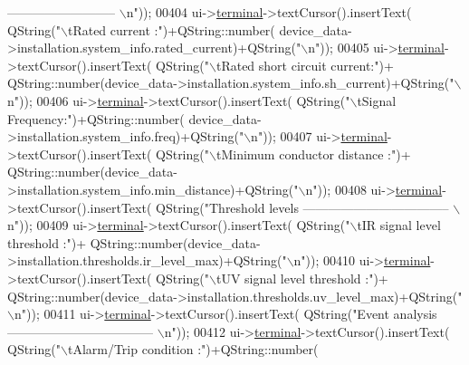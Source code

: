 \begin{DoxyCode}
{       -------------------------- \(\backslash\)n"}));
00404        ui->\hyperlink{a00080_aae71c46ea4546df5994735dee573b2dd}{terminal}->textCursor().insertText( QString(\textcolor{stringliteral}{"\(\backslash\)tRated current :"})+QString::number(
      device\_data->installation.system\_info.rated\_current)+QString(\textcolor{stringliteral}{"\(\backslash\)n"}));
00405        ui->\hyperlink{a00080_aae71c46ea4546df5994735dee573b2dd}{terminal}->textCursor().insertText( QString(\textcolor{stringliteral}{"\(\backslash\)tRated short circuit current:"})+
      QString::number(device\_data->installation.system\_info.sh\_current)+QString(\textcolor{stringliteral}{"\(\backslash\)n"}));
00406        ui->\hyperlink{a00080_aae71c46ea4546df5994735dee573b2dd}{terminal}->textCursor().insertText( QString(\textcolor{stringliteral}{"\(\backslash\)tSignal Frequency:"})+QString::number(
      device\_data->installation.system\_info.freq)+QString(\textcolor{stringliteral}{"\(\backslash\)n"}));
00407        ui->\hyperlink{a00080_aae71c46ea4546df5994735dee573b2dd}{terminal}->textCursor().insertText( QString(\textcolor{stringliteral}{"\(\backslash\)tMinimum conductor distance :"})+
      QString::number(device\_data->installation.system\_info.min\_distance)+QString(\textcolor{stringliteral}{"\(\backslash\)n"}));
00408        ui->\hyperlink{a00080_aae71c46ea4546df5994735dee573b2dd}{terminal}->textCursor().insertText( QString(\textcolor{stringliteral}{"Threshold levels    
       ----------------------------------- \(\backslash\)n"}));
00409        ui->\hyperlink{a00080_aae71c46ea4546df5994735dee573b2dd}{terminal}->textCursor().insertText( QString(\textcolor{stringliteral}{"\(\backslash\)tIR signal level threshold :"})+
      QString::number(device\_data->installation.thresholds.ir\_level\_max)+QString(\textcolor{stringliteral}{"\(\backslash\)n"}));
00410        ui->\hyperlink{a00080_aae71c46ea4546df5994735dee573b2dd}{terminal}->textCursor().insertText( QString(\textcolor{stringliteral}{"\(\backslash\)tUV signal level threshold :"})+
      QString::number(device\_data->installation.thresholds.uv\_level\_max)+QString(\textcolor{stringliteral}{"\(\backslash\)n"}));
00411        ui->\hyperlink{a00080_aae71c46ea4546df5994735dee573b2dd}{terminal}->textCursor().insertText( QString(\textcolor{stringliteral}{"Event analysis      
       ----------------------------------- \(\backslash\)n"}));
00412        ui->\hyperlink{a00080_aae71c46ea4546df5994735dee573b2dd}{terminal}->textCursor().insertText( QString(\textcolor{stringliteral}{"\(\backslash\)tAlarm/Trip condition :"})+QString::number(

\end{DoxyCode}
